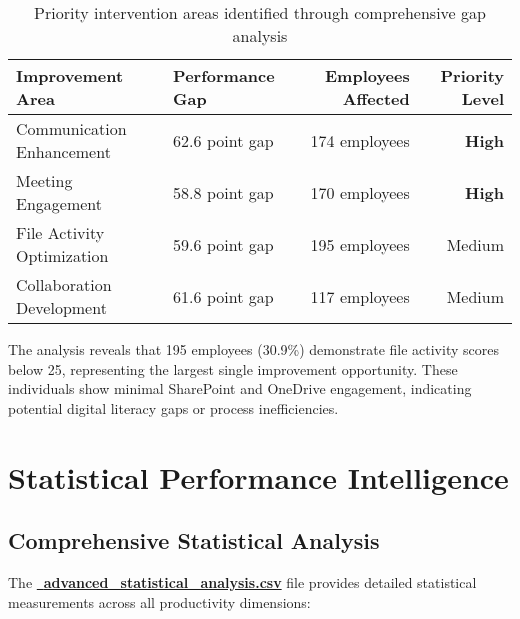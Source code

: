 \documentclass[12pt,a4paper]{article}
\begin{document}
\begin{table}[H]
\centering
\begin{tabularx}{\textwidth}{@{}lXrr@{}}
\toprule
\textbf{\color{primaryBlue}Improvement Area} & \textbf{\color{primaryBlue}Performance Gap} & \textbf{\color{primaryBlue}Employees Affected} & \textbf{\color{primaryBlue}Priority Level} \\
\midrule
Communication Enhancement & 62.6 point gap & 174 employees & \textbf{High} \\
Meeting Engagement & 58.8 point gap & 170 employees & \textbf{High} \\
File Activity Optimization & 59.6 point gap & 195 employees & Medium \\
Collaboration Development & 61.6 point gap & 117 employees & Medium \\
\bottomrule
\end{tabularx}
\caption{Priority intervention areas identified through comprehensive gap analysis}
\end{table}

The analysis reveals that 195 employees (30.9\%) demonstrate file activity scores below 25, representing the largest single improvement opportunity. These individuals show minimal SharePoint and OneDrive engagement, indicating potential digital literacy gaps or process inefficiencies.

\section{Statistical Performance Intelligence}

\subsection{Comprehensive Statistical Analysis}

The \textcolor{accentBlue}{\href{https://fixysaskihumorizijuv.supabase.co/storage/v1/object/public/research-files/6bc2ed7c-9918-4171-9b19-2d31fb67df5d-advanced_statistical_analysis.csv?download=}{{\normalsize\faChartLine}\, \textbf{advanced\_statistical\_analysis.csv}}} file provides detailed statistical measurements across all productivity dimensions:
\end{document}
